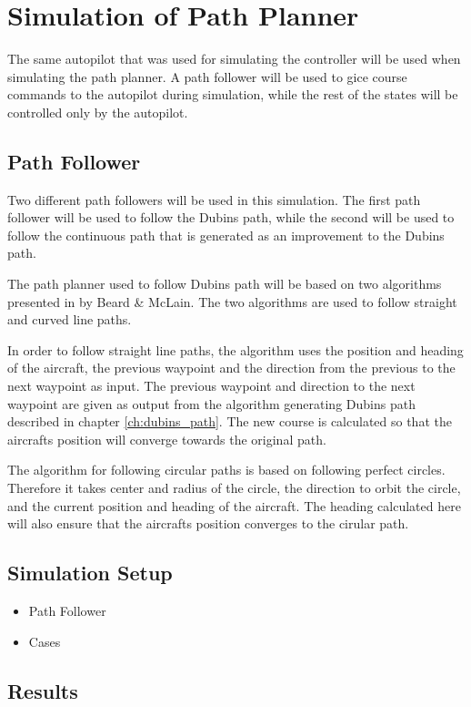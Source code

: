 \section{Simulation of Path Planner}

The same autopilot that was used for simulating the controller will be used when simulating the path planner. A path follower will be used to gice course commands to the autopilot during simulation, while the rest of the states will be controlled only by the autopilot.


\subsection{Path Follower}
\label{ch:path_follower}

Two different path followers will be used in this simulation. The first path follower will be used to follow the Dubins path, while the second will be used to follow the continuous path that is generated as an improvement to the Dubins path.

The path planner used to follow Dubins path will be based on two algorithms presented in \cite{suaBEARD} by Beard \& McLain. The two algorithms are used to follow straight and curved line paths.

In order to follow straight line paths, the algorithm uses the position and heading of the aircraft, the previous waypoint and the direction from the previous to the next waypoint as input. The previous waypoint and direction to the next waypoint are given as output from the algorithm generating Dubins path described in chapter \ref{ch:dubins_path}. The new course is calculated so that the aircrafts position will converge towards the original path.

The algorithm for following circular paths is based on following perfect circles. Therefore it takes center and radius of the circle, the direction to orbit the circle, and the current position and heading of the aircraft. The heading calculated here will also ensure that the aircrafts position converges to the cirular path.



\subsection{Simulation Setup}

\begin{itemize}
	\item Path Follower
	\item Cases
\end{itemize}





\subsection{Results}